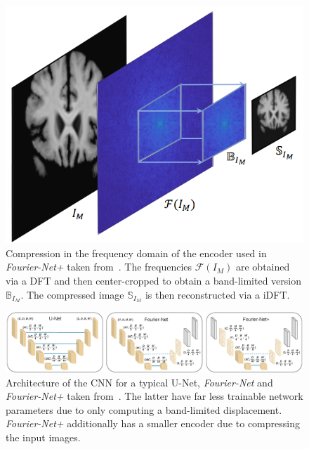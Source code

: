 \begin{figure}[h] %
	\centering
	\graphicspath{{images/}{\main/images/}}
	\includegraphics[width=.65\linewidth]{CompressionEncoder.png} 
	\caption{Compression in the frequency domain of the encoder used in \emph{Fourier-Net+} taken from~\cite{Fourier-Net+}. The frequencies $\mathcal{F}(I_M)$ are obtained via a DFT and then center-cropped to obtain a band-limited version $\mathbb{B}_{I_M}$. The compressed image $\mathbb{S}_{I_M}$ is then reconstructed via a iDFT.}
	\label{fig:Fourier-Net+EncoderCompression}
\end{figure}

\begin{figure}[h] %
	\centering
	\graphicspath{{images/}{\main/images/}}
	\includegraphics[width=\textwidth]{ArchitectureFourier-Net+CNN.png} 
	\caption{Architecture of the CNN for a typical U-Net, \emph{Fourier-Net} and \emph{Fourier-Net+} taken from~\cite{Fourier-Net+}. The latter have far less trainable network parameters due to only computing a band-limited displacement. \emph{Fourier-Net+} additionally has a smaller encoder due to compressing the input images.} %
	\label{fig:Fourier-Net+CNN}
\end{figure}

